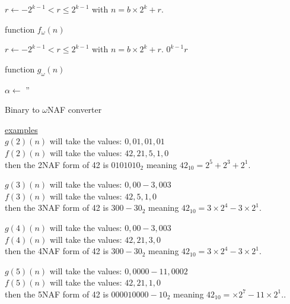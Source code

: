 			\begin{algorithm}[h]
				$r \leftarrow -2^{k-1}<r \leq 2^{k-1}$ 
				with $n = b \times 2^k + r$. \;					
				\caption{function $f_\omega(n)$}
			\end{algorithm}	
			\begin{algorithm}[h]
				$r \leftarrow -2^{k-1}<r \leq 2^{k-1}$ with $n = b \times 2^k + r$. \;	
				$0^{k-1}r$			 				
				\caption{function $g_\omega(n)$}
			\end{algorithm}					
			\begin{algorithm}[h]
				$\alpha \leftarrow$ ''												 
				\Return{$ \alpha $}												 				
				\caption{Binary to $\omega$NAF converter}
			\end{algorithm}	

	
\underline{examples}\\
$g(2)(n)$ will take the values: $     0, 01, 01, 01$\\
$f(2)(n)$ will take the values: $42, 21,  5,  1, 0$\\
then the 2NAF form of 42 is $0101010_2$ meaning $42_{10}= 2^5+2^3+2^1$.
		
$g(3)(n)$ will take the values: $ 0,  00-3, 003$\\
$f(3)(n)$ will take the values: $42,  5,    1, 0$\\
then the 3NAF form of 42 is $300-30_2$ meaning $42_{10}= 3 \times2^4 -3 \times 2^1$.		

$g(4)(n)$ will take the values: $ 0,  00-3, 003$\\
$f(4)(n)$ will take the values: $42, 21, 3, 0$	\\
then the 4NAF form of 42 is $300-30_2$ meaning $42_{10}= 3 \times2^4 -3 \times 2^1$.

$g(5)(n)$ will take the values: $ 0, 0000-11, 0002$\\
$f(5)(n)$ will take the values: $42, 21, 1, 0$\\
then the 5NAF form of 42 is $000010000-10_2$ meaning $42_{10}= \times2^7 -11 \times 2^1$..
%

